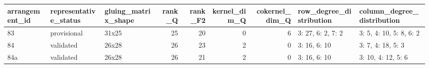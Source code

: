 \begin{tabular}{lllrrrrll}
\toprule
arrangement_id & representative_status & gluing_matrix_shape & rank_Q & rank_F2 & kernel_dim_Q & cokernel_dim_Q & row_degree_distribution & column_degree_distribution \\
\midrule
83 & provisional & 31x25 & 25 & 20 & 0 & 6 & {3: 27, 6: 2, 7: 2} & {3: 5, 4: 10, 5: 8, 6: 2} \\
84 & validated & 26x28 & 26 & 23 & 2 & 0 & {3: 16, 6: 10} & {3: 7, 4: 18, 5: 3} \\
84a & validated & 26x28 & 26 & 21 & 2 & 0 & {3: 16, 6: 10} & {3: 10, 4: 12, 5: 6} \\
\bottomrule
\end{tabular}
